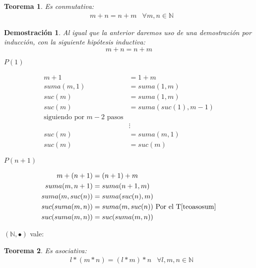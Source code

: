 \documentclass[9pt,a4paper]{article}
\theoremstyle{definition}
\theoremstyle{plain}
\newtheorem{teo}{Teorema}
\newtheorem{demo}{Demostración}[teo]
\begin{document}
\begin{teo} \label{teoconmusum} Es conmutativa:\\
\begin{align*} & m+n=n+m & \forall m,n\in{\mathbb{N}} \end{align*}
\end{teo}

\begin{demo}

Al igual que la anterior daremos uso de una demostración por inducción, con la siguiente hipótesis inductiva:\\

$$m+n=n+m$$

$P(1)$

\begin{align*}
m+1       &= 1+m\\
suma(m,1) &= suma(1,m)\\
suc(m)    &= suma(1,m)\\
suc(m)    &= suma(suc(1), m-1)\\
\text{siguiendo por $m-2$ pasos}\\
          & \vdots\\
suc(m)    &= suma(m, 1)\\
suc(m)    &= suc(m)
\end{align*}

$P(n+1)$

\begin{align*}
m+(n+1)         &= (n+1)+m\\
suma(m,n+1)     &= suma(n+1,m)\\
suma(m, suc(n)) &= suma(suc(n), m)\\
suc(suma(m,n))  &= suma(m,suc(n)) \text{ Por el T\ref{teoasosum}}\\
suc(suma(m,n))  &= suc(suma(m,n))
\end{align*}
\end{demo}

$(\mathbb{N}, \bullet)$ vale:

\begin{teo} \label{teoasopro}Es asociativa:\\
\begin{align*} & l*(m*n)=(l*m)*n & \forall l,m,n\in{\mathbb{N}} \end{align*}
\end{teo}
\end{document}
